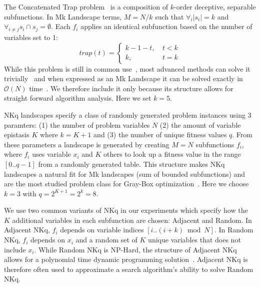 \documentclass[runningheads,a4paper]{llncs}
\newcommand{\BigO}[1]{$\mathcal{O}{(#1)}$}
\begin{document}
The Concatenated Trap problem~\cite{deb:1992:trap} is a composition of $k$-order deceptive,
separable subfunctions. In Mk Landscape terms, $M=N/k$ such that $\forall_i |s_i| = k$ and
$\forall_{i \neq j} s_i \cap s_j = \emptyset$. Each $f_i$ applies an identical subfunction based
on the number of variables set to 1:
\begin{equation}
   trap(t) = \left\{
     \begin{array}{rl}
       k-1-t,~ &  t<k\\
       k,~   &  t = k
     \end{array}
   \right.
  \label{eq-trap}
\end{equation}
While this problem is still in common use~\cite{hsu:2015:dsmgaII,inoue:2015:adaptivep3},
most advanced methods can solve it trivially~\cite{goldman:2012:ltga} and when expressed
as an Mk Landscape it can be solved exactly in \BigO{N} time~\cite{whitley:2015:mk}.
We therefore include it only because its structure allows for straight forward algorithm analysis.
Here we set $k=5$.

NKq landscapes specify a class of randomly generated problem instances using 3 paramters:
(1) the number of problem variables $N$ (2) the amount of variable epistasis $K$ where $k=K+1$
and (3) the number of unique fitness values $q$. From these parameters a landscape is generated
by creating $M=N$ subfunctions $f_i$, where $f_i$ uses variable $x_i$ and $K$ others to look up
a fitness value in the range $[0..q-1]$ from a randomly generated table. This structure
makes NKq landscapes a natural fit for Mk landscapes (sum of bounded subfunctions)
and are the most studied problem class for Gray-Box
optimization~\cite{whitley:2012:constant,chicano:2014:ball,goldman:2015:GBO,tintos:2015:partitioncross,ochoa:2015:crossovernetworks,whitley:2015:mk}.
Here we choose $k=3$ with $q=2^{K+1}=2^{k}=8$.

We use two common variants of NKq in our experiments which specify how the $K$ additional
variables in each subfunction are chosen: Adjacent and Random. In Adjacent NKq, $f_i$ depends
on variable indices $[i..(i+k) \bmod N]$. In Random NKq, $f_i$ depends on $x_i$ and a random
set of $K$ unique variables that does not include $x_i$. While Random NKq is NP-Hard,
the structure of Adjacent NKq allows for a polynomial time dynamic programming solution~\cite{wright:2000:solvingnk}.
Adjacent NKq is therefore often used to approximate a search algorithm's ability to
solve Random NKq.
\end{document}
